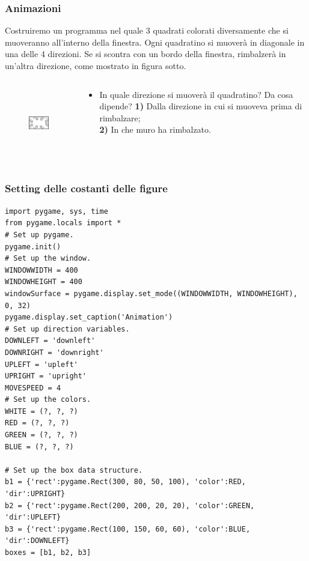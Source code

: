 \documentclass{beamer}
\begin{document}
\begin{frame}[fragile]
\frametitle{Animazioni}
Costruiremo un programma nel quale 3 quadrati colorati diversamente che si muoveranno all'interno della finestra. Ogni quadratino si muoverà in diagonale in una delle 4 direzioni. Se si scontra con un bordo della finestra, rimbalzerà in un'altra direzione, come mostrato in figura sotto.
\begin{columns}
	\begin{column}[T]{0.5\textwidth}
		\begin{figure}[t]
			\includegraphics[height=3cm, width=4cm]{images/animazioni.png}
		\end{figure}
	\end{column}
	\begin{column}[T]{0.5\textwidth}
		\begin{itemize}
			\item In quale direzione si muoverà il quadratino? Da cosa dipende?
			\textbf{1)} Dalla direzione in cui si muoveva prima di rimbalzare; \\
			\textbf{2)} In che muro ha rimbalzato.
		\end{itemize}
	\end{column}
\end{columns}
\end{frame}

\begin{frame}[fragile]
\frametitle{Setting delle costanti delle figure}
\lstset{basicstyle=\tiny}
	\begin{lstlisting}
import pygame, sys, time
from pygame.locals import *
# Set up pygame.
pygame.init()
# Set up the window.
WINDOWWIDTH = 400
WINDOWHEIGHT = 400
windowSurface = pygame.display.set_mode((WINDOWWIDTH, WINDOWHEIGHT), 0, 32)
pygame.display.set_caption('Animation')
# Set up direction variables.
DOWNLEFT = 'downleft'
DOWNRIGHT = 'downright'
UPLEFT = 'upleft'
UPRIGHT = 'upright'
MOVESPEED = 4
# Set up the colors.
WHITE = (?, ?, ?)
RED = (?, ?, ?)
GREEN = (?, ?, ?)
BLUE = (?, ?, ?)

# Set up the box data structure.
b1 = {'rect':pygame.Rect(300, 80, 50, 100), 'color':RED, 'dir':UPRIGHT}
b2 = {'rect':pygame.Rect(200, 200, 20, 20), 'color':GREEN, 'dir':UPLEFT}
b3 = {'rect':pygame.Rect(100, 150, 60, 60), 'color':BLUE, 'dir':DOWNLEFT}
boxes = [b1, b2, b3]
	\end{lstlisting}
\end{frame}
\end{document}
